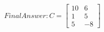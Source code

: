 \documentclass[preview]{standalone}
\begin{document}
\begin{align*}
Final Answer: C = \begin{bmatrix} 10 & 6 \\ 1 & 5 \\ 5 & -8 \end{bmatrix}
\end{align*}
\end{document}
